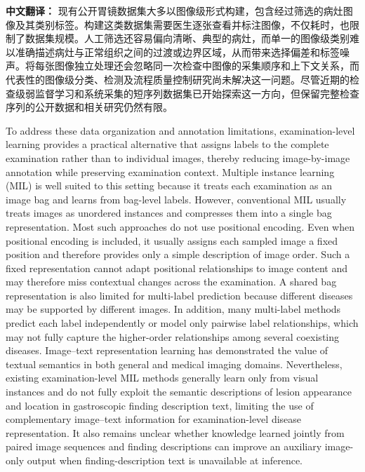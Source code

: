 \documentclass[Afour,sagev,times]{sagej}
\begin{document}
\noindent\textbf{中文翻译：}
现有公开胃镜数据集大多以图像级形式构建，包含经过筛选的病灶图像及其类别标签。构建这类数据集需要医生逐张查看并标注图像，不仅耗时，也限制了数据集规模。人工筛选还容易偏向清晰、典型的病灶，而单一的图像级类别难以准确描述病灶与正常组织之间的过渡或边界区域，从而带来选择偏差和标签噪声。将每张图像独立处理还会忽略同一次检查中图像的采集顺序和上下文关系，而代表性的图像级分类、检测及流程质量控制研究尚未解决这一问题。尽管近期的检查级弱监督学习和系统采集的短序列数据集已开始探索这一方向，但保留完整检查序列的公开数据和相关研究仍然有限。

To address these data organization and annotation limitations, examination-level learning provides a practical alternative that assigns labels to the complete examination rather than to individual images, thereby reducing image-by-image annotation while preserving examination context. Multiple instance learning (MIL) is well suited to this setting because it treats each examination as an image bag and learns from bag-level labels. However, conventional MIL usually treats images as unordered instances and compresses them into a single bag representation. Most such approaches do not use positional encoding. Even when positional encoding is included, it usually assigns each sampled image a fixed position and therefore provides only a simple description of image order. Such a fixed representation cannot adapt positional relationships to image content and may therefore miss contextual changes across the examination. A shared bag representation is also limited for multi-label prediction because different diseases may be supported by different images. In addition, many multi-label methods predict each label independently or model only pairwise label relationships, which may not fully capture the higher-order relationships among several coexisting diseases. Image--text representation learning has demonstrated the value of textual semantics in both general and medical imaging domains. Nevertheless, existing examination-level MIL methods generally learn only from visual instances and do not fully exploit the semantic descriptions of lesion appearance and location in gastroscopic finding description text, limiting the use of complementary image--text information for examination-level disease representation. It also remains unclear whether knowledge learned jointly from paired image sequences and finding descriptions can improve an auxiliary image-only output when finding-description text is unavailable at inference.
\end{document}
